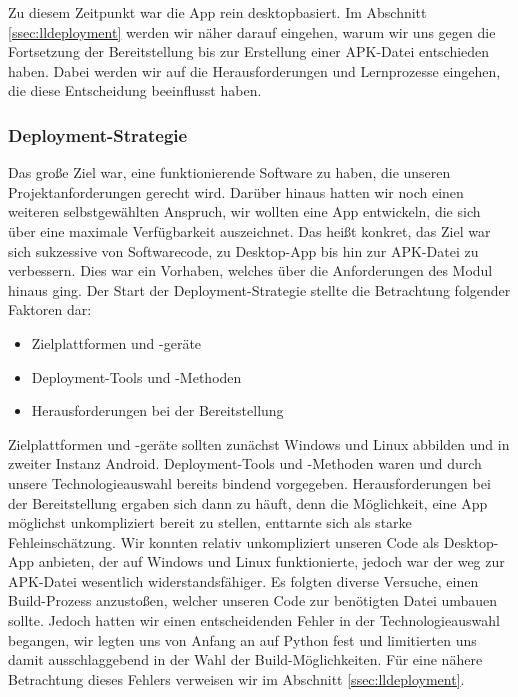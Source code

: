		Zu diesem Zeitpunkt war die App rein desktopbasiert. Im Abschnitt \ref{ssec:lldeployment} werden wir näher darauf eingehen, warum wir uns gegen die Fortsetzung der Bereitstellung bis zur Erstellung einer APK-Datei entschieden haben. Dabei werden wir auf die Herausforderungen und Lernprozesse eingehen, die diese Entscheidung beeinflusst haben.
		
	\subsubsection{Deployment-Strategie}
	\label{sssec:deployment}
		
		Das große Ziel war, eine funktionierende Software zu haben, die unseren Projektanforderungen gerecht wird. Darüber hinaus hatten wir noch einen weiteren selbstgewählten Anspruch, wir wollten eine App entwickeln, die sich über eine maximale Verfügbarkeit auszeichnet. Das heißt konkret, das Ziel war sich sukzessive von Softwarecode, zu Desktop-App bis hin zur APK-Datei zu verbessern. Dies war ein Vorhaben, welches über die Anforderungen des Modul hinaus ging. Der Start der Deployment-Strategie stellte die Betrachtung folgender Faktoren dar:
		
		\begin{itemize}
			\item Zielplattformen und -geräte
			\item Deployment-Tools und -Methoden
			\item Herausforderungen bei der Bereitstellung
		\end{itemize}
		
		\noindent Zielplattformen und -geräte sollten zunächst Windows und Linux abbilden und in zweiter Instanz Android. Deployment-Tools und -Methoden waren und durch unsere Technologieauswahl bereits bindend vorgegeben. Herausforderungen bei der Bereitstellung ergaben sich dann zu häuft, denn die Möglichkeit, eine App möglichst unkompliziert bereit zu stellen, enttarnte sich als starke Fehleinschätzung. Wir konnten relativ unkompliziert unseren Code als Desktop-App anbieten, der auf Windows und Linux funktionierte, jedoch war der weg zur APK-Datei wesentlich widerstandsfähiger. Es folgten diverse Versuche, einen Build-Prozess anzustoßen, welcher unseren Code zur benötigten Datei umbauen sollte. Jedoch hatten wir einen entscheidenden Fehler in der Technologieauswahl begangen, wir legten uns von Anfang an auf Python fest und limitierten uns damit ausschlaggebend in der Wahl der Build-Möglichkeiten. Für eine nähere Betrachtung dieses Fehlers verweisen wir im Abschnitt \ref{ssec:lldeployment}.
